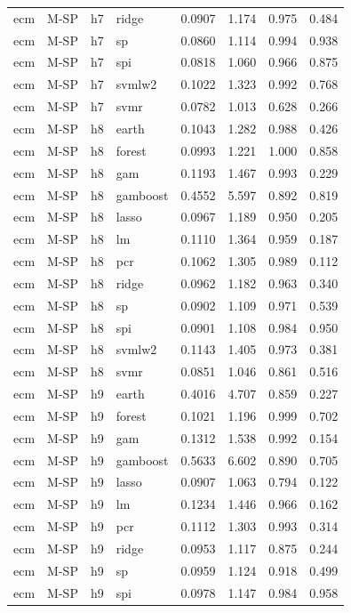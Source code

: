 \begin{ThreePartTable}
\begin{longtable}[t]{llclcccc}
ecm & M-SP & h7 & ridge & 0.0907 & 1.174 & 0.975 & 0.484\\
ecm & M-SP & h7 & sp & 0.0860 & 1.114 & 0.994 & 0.938\\
ecm & M-SP & h7 & spi & 0.0818 & 1.060 & 0.966 & 0.875\\
ecm & M-SP & h7 & svmlw2 & 0.1022 & 1.323 & 0.992 & 0.768\\
ecm & M-SP & h7 & svmr & 0.0782 & 1.013 & 0.628 & 0.266\\
\addlinespace
ecm & M-SP & h8 & earth & 0.1043 & 1.282 & 0.988 & 0.426\\
ecm & M-SP & h8 & forest & 0.0993 & 1.221 & 1.000 & 0.858\\
ecm & M-SP & h8 & gam & 0.1193 & 1.467 & 0.993 & 0.229\\
ecm & M-SP & h8 & gamboost & 0.4552 & 5.597 & 0.892 & 0.819\\
ecm & M-SP & h8 & lasso & 0.0967 & 1.189 & 0.950 & 0.205\\
ecm & M-SP & h8 & lm & 0.1110 & 1.364 & 0.959 & 0.187\\
ecm & M-SP & h8 & pcr & 0.1062 & 1.305 & 0.989 & 0.112\\
ecm & M-SP & h8 & ridge & 0.0962 & 1.182 & 0.963 & 0.340\\
ecm & M-SP & h8 & sp & 0.0902 & 1.109 & 0.971 & 0.539\\
ecm & M-SP & h8 & spi & 0.0901 & 1.108 & 0.984 & 0.950\\
ecm & M-SP & h8 & svmlw2 & 0.1143 & 1.405 & 0.973 & 0.381\\
ecm & M-SP & h8 & svmr & 0.0851 & 1.046 & 0.861 & 0.516\\
\addlinespace
ecm & M-SP & h9 & earth & 0.4016 & 4.707 & 0.859 & 0.227\\
ecm & M-SP & h9 & forest & 0.1021 & 1.196 & 0.999 & 0.702\\
ecm & M-SP & h9 & gam & 0.1312 & 1.538 & 0.992 & 0.154\\
ecm & M-SP & h9 & gamboost & 0.5633 & 6.602 & 0.890 & 0.705\\
ecm & M-SP & h9 & lasso & 0.0907 & 1.063 & 0.794 & 0.122\\
ecm & M-SP & h9 & lm & 0.1234 & 1.446 & 0.966 & 0.162\\
ecm & M-SP & h9 & pcr & 0.1112 & 1.303 & 0.993 & 0.314\\
ecm & M-SP & h9 & ridge & 0.0953 & 1.117 & 0.875 & 0.244\\
ecm & M-SP & h9 & sp & 0.0959 & 1.124 & 0.918 & 0.499\\
ecm & M-SP & h9 & spi & 0.0978 & 1.147 & 0.984 & 0.958\\

\end{longtable}
\end{ThreePartTable}

